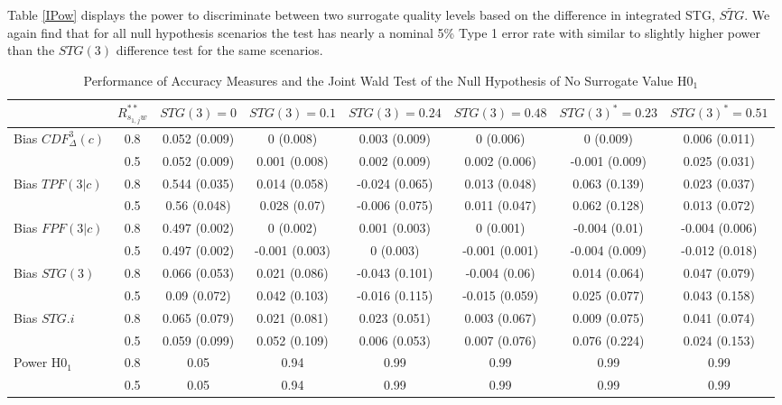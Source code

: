 \documentclass[times, doublespace]{simauth}
\begin{document}
Table \ref{IPow} displays the power to discriminate between two surrogate quality levels based on the difference in integrated STG, $\widetilde{STG}$. We again find that for all null hypothesis scenarios the test has nearly a nominal 5\% Type 1 error rate with similar to slightly higher power than the $STG(3)$ difference test for the same scenarios. 

\begin{table}
\begin{center}
\caption{Performance of Accuracy Measures and the Joint Wald Test of the Null Hypothesis of No Surrogate Value H0$_1$ \label{Bias}}
\begin{tabular}{lccccccc}
  \hline
&$R_{s_{1,j}w}^{**}$&$STG(3)=0$ & $STG(3)=0.1$  & $STG(3)=0.24$  & $STG(3)=0.48$&$STG(3)^{*}=0.23$&$STG(3)^{*}=0.51$\\ 
  \hline
Bias $CDF^{3}_{\Delta}(c)$& 0.8& 0.052 (0.009) & 0 (0.008) & 0.003 (0.009) & 0 (0.006) & 0 (0.009) & 0.006 (0.011) \\ 
 &0.5& 0.052 (0.009) & 0.001 (0.008) & 0.002 (0.009) & 0.002 (0.006) & -0.001 (0.009) & 0.025 (0.031) \\ 
Bias $TPF(3|c)$& 0.8& 0.544 (0.035) & 0.014 (0.058) & -0.024 (0.065) & 0.013 (0.048) & 0.063 (0.139) & 0.023 (0.037) \\ 
 &0.5& 0.56 (0.048) & 0.028 (0.07) & -0.006 (0.075) & 0.011 (0.047) & 0.062 (0.128) & 0.013 (0.072) \\ 
Bias $FPF(3|c)$& 0.8& 0.497 (0.002) & 0 (0.002) & 0.001 (0.003) & 0 (0.001) & -0.004 (0.01) & -0.004 (0.006) \\ 
 &0.5& 0.497 (0.002) & -0.001 (0.003) & 0 (0.003) & -0.001 (0.001) & -0.004 (0.009) & -0.012 (0.018) \\ 
Bias $STG(3)$& 0.8& 0.066 (0.053) & 0.021 (0.086) & -0.043 (0.101) & -0.004 (0.06) & 0.014 (0.064) & 0.047 (0.079) \\
  &0.5 & 0.09 (0.072) & 0.042 (0.103) & -0.016 (0.115) & -0.015 (0.059) & 0.025 (0.077) & 0.043 (0.158) \\ 
Bias $STG.i$ & 0.8 & 0.065 (0.079)& 0.021 (0.081)& 0.023 (0.051)& 0.003 (0.067) & 0.009 (0.075) & 0.041 (0.074) \\
 & 0.5 & 0.059 (0.099) & 0.052 (0.109) & 0.006 (0.053)& 0.007 (0.076)& 0.076 (0.224) & 0.024 (0.153) \\
Power H0$_1$& 0.8& 0.05 & 0.94 & 0.99 & 0.99 & 0.99 & 0.99 \\ 
  &0.5& 0.05 & 0.94 & 0.99 & 0.99 & 0.99 & 0.99 \\ 
   \hline

\end{tabular}
\end{center}
\end{table}
\end{document}
